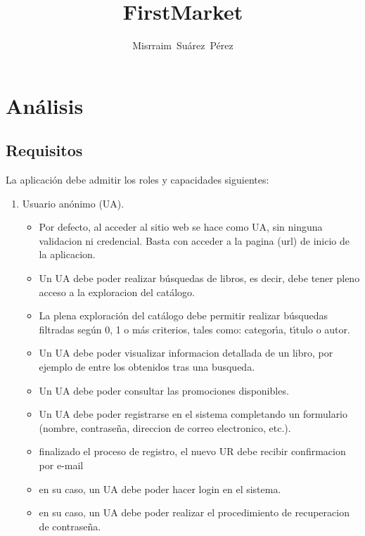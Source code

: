 \documentclass[a4paper]{report}
\author{Misrraim~Su\'arez~P\'erez}
\title{FirstMarket}
\begin{document}
    \maketitle
    \tableofcontents

    \section{An\'alisis}\label{sec:an'alisis}

        \subsection{Requisitos}\label{subsec:requisitos}

            La aplicaci\'on debe admitir los roles y capacidades siguientes:
            \begin{enumerate}
                \item Usuario an\'onimo (UA).
                \begin{itemize}
                    \item Por defecto, al acceder al sitio web se hace como UA, sin ninguna validacion ni credencial. Basta con acceder a la pagina (url) de inicio de la aplicacion.
                    \item Un UA debe poder realizar b\'usquedas de libros, es decir, debe tener pleno acceso a la exploracion del cat\'alogo.
                    \item La plena exploraci\'on del cat\'alogo debe permitir realizar b\'usque\-das filtradas seg\'un 0, 1 o m\'as criterios, tales como: categor\'\i{}a, t\'\i{}tulo o autor.
                    \item Un UA debe poder visualizar informacion detallada de un libro, por ejemplo de entre los obtenidos tras una busqueda.
                    \item Un UA debe poder consultar las promociones disponibles.
                    \item Un UA debe poder registrarse en el sistema completando un formulario (nombre, contrase\~na, direccion de correo electronico, etc.).
                    \item finalizado el proceso de registro, el nuevo UR debe recibir confirmacion por e-mail
                    \item en su caso, un UA debe poder hacer login en el sistema.
                    \item en su caso, un UA debe poder realizar el procedimiento de recuperacion de contrase\~na.

\end{itemize}
\end{enumerate}
\end{document}

